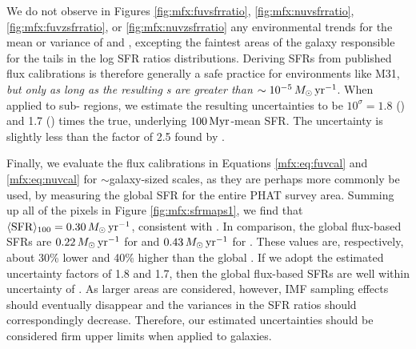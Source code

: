 We do not observe in Figures \ref{fig:mfx:fuvsfrratio},
\ref{fig:mfx:nuvsfrratio}, \ref{fig:mfx:fuvzsfrratio}, or
\ref{fig:mfx:nuvzsfrratio} any environmental trends for the mean or variance of
\sfrx{} and \sfrxz{}, excepting the faintest areas of the galaxy responsible
for the tails in the log SFR ratios distributions. Deriving SFRs from published
flux calibrations is therefore generally a safe practice for environments like
M31, \emph{but only as long as the resulting \sfr{}s are greater than $\sim
10^{-5}\,M_\odot\,\mathrm{yr}^{-1}$}. When applied to sub-\kpc{} regions, we estimate the
resulting uncertainties to be $10^\sigma = 1.8$ (\fuv{}) and 1.7 (\nuv{}) times
the true, underlying $100\,\mathrm{Myr}$-mean SFR. The \sfrfuv{} uncertainty is slightly
less than the factor of 2.5 found by \citet{Simones:2014}.

Finally, we evaluate the flux calibrations in Equations \ref{mfx:eq:fuvcal} and
\ref{mfx:eq:nuvcal} for $\sim$galaxy-sized scales, as they are perhaps more
commonly be used, by measuring the global SFR for the entire PHAT survey area.
Summing up all of the pixels in Figure \ref{fig:mfx:sfrmaps1}, we find that
$\langle\mathrm{SFR}\rangle_{100}=0.30\,M_\odot\,\mathrm{yr}^{-1}$, consistent with \citet{Lewis:2014}. In
comparison, the global flux-based SFRs are $0.22\,M_\odot\,\mathrm{yr}^{-1}$ for \fuv{} and
$0.43\,M_\odot\,\mathrm{yr}^{-1}$ for \nuv{}. These values are, respectively, about 30\%
lower and 40\% higher than the global \sfroneh{}. If we adopt the estimated
uncertainty factors of 1.8 and 1.7, then the global flux-based SFRs are well
within uncertainty of \sfroneh{}. As larger areas are considered, however, IMF
sampling effects should eventually disappear and the variances in the SFR
ratios should correspondingly decrease. Therefore, our estimated uncertainties
should be considered firm upper limits when applied to galaxies.


